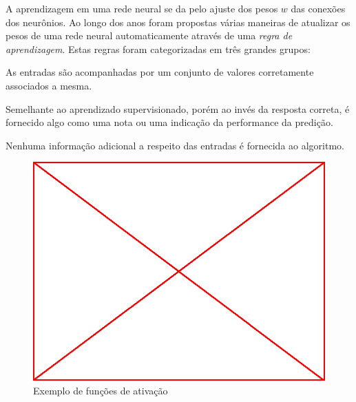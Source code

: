 A aprendizagem em uma rede neural se da pelo ajuste dos pesos $w$ das conexões
dos neurônios. Ao longo dos anos foram propostas várias maneiras de atualizar
os pesos de uma rede neural automaticamente através de uma \emph{regra de
  aprendizagem}. Estas regras foram categorizadas em três grandes grupos:

\begin{description}

  \itemsep1pt\parskip0pt

  \item[Aprendizagem Supervisionada] As entradas são acompanhadas por um
    conjunto de valores corretamente associados a mesma.

  \item[Aprendizagem Por Reforço] Semelhante ao aprendizado supervisionado,
    porém ao invés da resposta correta, é fornecido algo como uma nota ou uma
    indicação da performance da predição.

  \item[Aprendizagem Não Supervisionada] Nenhuma informação adicional a
    respeito das entradas é fornecida ao algoritmo.

\end{description}

\begin{figure}\label{fig:limit-functions-exapmple}
  \caption{Exemplo de funções de ativação}
  \begin{center}
    \includegraphics[scale=0.5]{placeholder}
  \end{center}
\end{figure}


